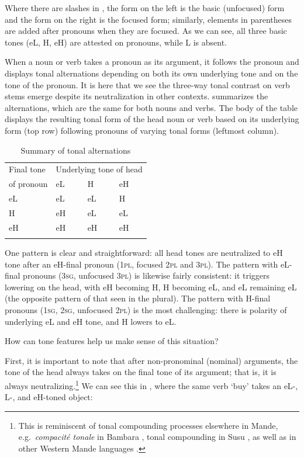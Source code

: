 \documentclass[output=paper]{langsci/langscibook}
\begin{document}
Where there are slashes in , the form on the left is the basic (unfocused) form and the form on the right is the focused form; similarly, elements in parentheses are added after pronouns when they are focused. As we can see, all three basic tones (eL, H, eH) are attested on pronouns, while L is absent.

When a noun or verb takes a pronoun as its argument, it follows the pronoun and displays tonal alternations depending on both its own underlying tone and on the tone of the pronoun. It is here that we see the three-way tonal contrast on verb stems emerge despite its neutralization in other contexts.  summarizes the alternations, which are the same for both nouns and verbs. The body of the table displays the resulting tonal form of the head noun or verb based on its underlying form (top row) following pronouns of varying tonal forms (leftmost column).

\begin{table}
\begin{tabularx}{\textwidth}{X|XXX} 
\lsptoprule
Final tone & \multicolumn{3}{c}{Underlying tone of head} \\
of pronoun & eL & H & eH \\ \midrule
eL & eL & eL & H \\
H & eH & eL & eL \\
eH & eH & eH & eH \\
\lspbottomrule
\end{tabularx}
\caption{Summary of tonal alternations}
\label{tab:mcpherson:3}
\end{table}

One pattern is clear and straightforward: all head tones are neutralized to eH tone after an eH-final pronoun (1\textsc{pl}, focused 2\textsc{pl} and 3\textsc{pl}). The pattern with eL-final pronouns (3\textsc{sg}, unfocused 3\textsc{pl}) is likewise fairly consistent: it triggers lowering on the head, with eH becoming H, H becoming eL, and eL remaining eL (the opposite pattern of that seen in the plural). The pattern with H-final pronouns (1\textsc{sg}, 2\textsc{sg}, unfocused 2\textsc{pl}) is the most challenging: there is polarity of underlying eL and eH tone, and H lowers to eL. 

How can tone features help us make sense of this situation?

First, it is important to note that after non-pronominal (nominal) arguments, the tone of the head always takes on the final tone of its argument; that is, it is always neutralizing.\footnote{This is reminiscent of tonal compounding processes elsewhere in Mande, e.g.\ {\it compacit\'e tonale} in Bambara \citep{Creissels78,Creissels88,Creissels92,Dumestre84,Green10}, tonal compounding in Susu \citep{Gregoire78,Greenetal13}, as well as in other Western Mande languages \citep{deZeeuw79}.} We can see this in , where the same verb {\it {}} `buy' takes an eL-, L-, and eH-toned object:
\end{document}

